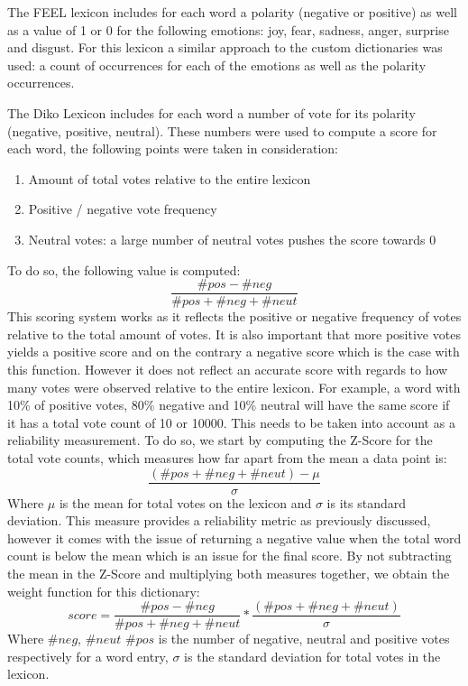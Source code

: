 The FEEL lexicon includes for each word a polarity (negative or positive) as well as a value of 1 or 0 for the following emotions: joy, fear, sadness, anger, surprise and disgust. For this lexicon a similar approach to the custom dictionaries was used: a count of occurrences for each of the emotions as well as the polarity occurrences.

The Diko Lexicon includes for each word a number of vote for its polarity (negative, positive, neutral). These numbers were used to compute a score for each word, the following points were taken in consideration:
\begin{enumerate}
    \item Amount of total votes relative to the entire lexicon
    \item Positive / negative vote frequency
    \item Neutral votes: a large number of neutral votes pushes the score towards 0
\end{enumerate}
To do so, the following value is computed:
\begin{equation}
    \frac{\#pos - \#neg}{\#pos + \#neg + \#neut}
\end{equation}
This scoring system works as it reflects the positive or negative frequency of votes relative to the total amount of votes. It is also important that more positive votes yields a positive score and on the contrary a negative score which is the case with this function. However it does not reflect an accurate score with regards to how many votes were observed relative to the entire lexicon. For example, a word with 10\% of positive votes, 80\% negative and 10\% neutral will have the same score if it has a total vote count of 10 or 10000. This needs to be taken into account as a reliability measurement.
To do so, we start by computing the Z-Score for the total vote counts, which measures how far apart from the mean a data point is:
\begin{equation}
    \frac{(\#pos + \#neg + \#neut) - \mu}{\sigma}
\end{equation}
Where $\mu$ is the mean for total votes on the lexicon and $\sigma$ is its standard deviation. This measure provides a reliability metric as previously discussed, however it comes with the issue of returning a negative value when the total word count is below the mean which is an issue for the final score. By not subtracting the mean in the Z-Score and multiplying both measures together, we obtain the weight function for this dictionary:
\begin{equation}
\label{diko score}
    score = \frac{\#pos - \#neg}{\#pos + \#neg + \#neut} * \frac{(\#pos + \#neg + \#neut)}{\sigma}
\end{equation}
Where $\#neg$, $\#neut$ $\#pos$ is the number of negative, neutral and positive votes respectively for a word entry, $\sigma$ is the standard deviation for total votes in the lexicon.

